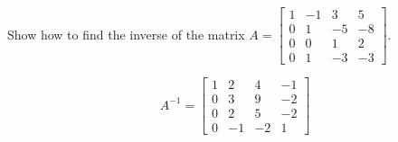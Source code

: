 
\begin{exerciseStatement}


Show how to find the inverse of the matrix \(A= \left[\begin{array}{cccc}
1 & -1 & 3 & 5 \\
0 & 1 & -5 & -8 \\
0 & 0 & 1 & 2 \\
0 & 1 & -3 & -3
\end{array}\right] \).


\end{exerciseStatement}
    
\begin{exerciseAnswer} 
\[A^{-1}= \left[\begin{array}{cccc}
1 & 2 & 4 & -1 \\
0 & 3 & 9 & -2 \\
0 & 2 & 5 & -2 \\
0 & -1 & -2 & 1
\end{array}\right] \]
\end{exerciseAnswer}
    
